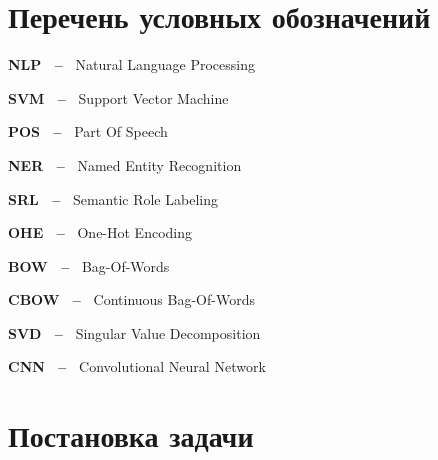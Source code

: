 
    

\usepackage[%
                a4paper,
                top=2cm, %
                bottom=2cm, %
                left=3cm, %
                right=1.5cm,
                includehead=false,
                bmargin=2cm,
                footnotesep=0cm,
                ]{geometry}
                \usepackage{fancyhdr} 

\setcounter{secnumdepth}{5}
\setcounter{tocdepth}{5}
\newcommand\simpleparagraph[1]{%
  \stepcounter{paragraph}\paragraph*{\theparagraph\quad{}#1}}
  




\section*{Перечень условных обозначений}
\label{sec:table}

\textbf{NLP ~--~} Natural Language Processing

\textbf{SVM ~--~} Support Vector Machine

\textbf{POS ~--~} Part Of Speech

\textbf{NER ~--~} Named Entity Recognition

\textbf{SRL ~--~} Semantic Role Labeling

\textbf{OHE ~--~} One-Hot Encoding

\textbf{BOW ~--~} Bag-Of-Words

\textbf{CBOW ~--~} Continuous Bag-Of-Words

\textbf{SVD ~--~} Singular Value Decomposition

\textbf{CNN ~--~} Convolutional Neural Network

\newpage
\section*{Постановка задачи}
\label{sec:start}

